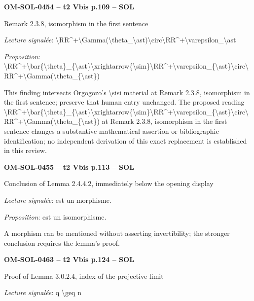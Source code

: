 \par\noindent\textbf{OM-SOL-0454 -- t2 Vbis p.109 -- SOL}\par
Remark 2.3.8, isomorphism in the first sentence\par
\emph{Lecture signalée}: \textbackslash{}RR\textasciicircum{}+\textbackslash{}Gamma(\textbackslash{}theta\_\textbackslash{}ast)\textbackslash{}circ\textbackslash{}RR\textasciicircum{}+\textbackslash{}varepsilon\_\textbackslash{}ast\par
\emph{Proposition}: \textbackslash{}RR\textasciicircum{}+\textbackslash{}bar\{\textbackslash{}theta\}\_\{\textbackslash{}ast\}\textbackslash{}xrightarrow\{\textbackslash{}sim\}\textbackslash{}RR\textasciicircum{}+\textbackslash{}varepsilon\_\{\textbackslash{}ast\}\textbackslash{}circ\textbackslash{}RR\textasciicircum{}+\textbackslash{}Gamma(\textbackslash{}theta\_\{\textbackslash{}ast\})\par
This finding intersects Orgogozo's \textbackslash{}sisi material at Remark 2.3.8, isomorphism in the first sentence; preserve that human entry unchanged. The proposed reading \textbackslash{}RR\textasciicircum{}+\textbackslash{}bar\{\textbackslash{}theta\}\_\{\textbackslash{}ast\}\textbackslash{}xrightarrow\{\textbackslash{}sim\}\textbackslash{}RR\textasciicircum{}+\textbackslash{}varepsilon\_\{\textbackslash{}ast\}\textbackslash{}circ\textbackslash{}RR\textasciicircum{}+\textbackslash{}Gamma(\textbackslash{}theta\_\{\textbackslash{}ast\}) at Remark 2.3.8, isomorphism in the first sentence changes a substantive mathematical assertion or bibliographic identification; no independent derivation of this exact replacement is established in this review.\par
\par\noindent\textbf{OM-SOL-0455 -- t2 Vbis p.113 -- SOL}\par
Conclusion of Lemma 2.4.4.2, immediately below the opening display\par
\emph{Lecture signalée}: est un morphisme.\par
\emph{Proposition}: est un isomorphisme.\par
A morphism can be mentioned without asserting invertibility; the stronger conclusion requires the lemma's proof.\par
\par\noindent\textbf{OM-SOL-0463 -- t2 Vbis p.124 -- SOL}\par
Proof of Lemma 3.0.2.4, index of the projective limit\par
\emph{Lecture signalée}: q \textbackslash{}geq n\par
